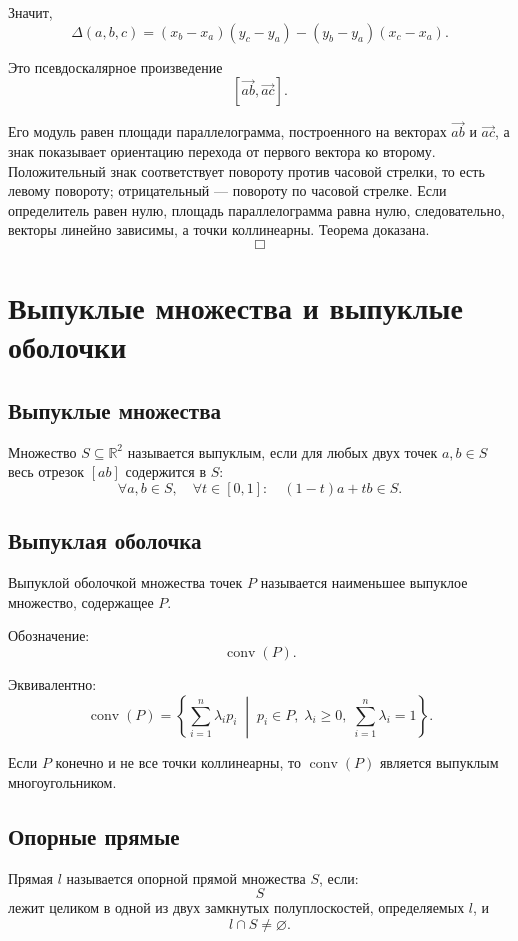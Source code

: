 \documentclass[12pt,a4paper]{article}
\begin{document}
Значит,
\[
\Delta(a,b,c)
=
(x_b-x_a)(y_c-y_a)
-
(y_b-y_a)(x_c-x_a).
\]

Это псевдоскалярное произведение
\[
[\overrightarrow{ab},\overrightarrow{ac}].
\]

Его модуль равен площади параллелограмма, построенного на векторах
\(\overrightarrow{ab}\) и \(\overrightarrow{ac}\), а знак показывает ориентацию перехода от первого вектора ко второму. Положительный знак соответствует повороту против часовой стрелки, то есть левому повороту; отрицательный — повороту по часовой стрелке. Если определитель равен нулю, площадь параллелограмма равна нулю, следовательно, векторы линейно зависимы, а точки коллинеарны. Теорема доказана.
\[
\Box
\]

\section{Выпуклые множества и выпуклые оболочки}

\subsection{Выпуклые множества}

Множество \(S\subseteq\mathbb{R}^2\) называется выпуклым, если для любых двух точек \(a,b\in S\) весь отрезок \([ab]\) содержится в \(S\):
\[
\forall a,b\in S,\quad
\forall t\in[0,1]:
\quad
(1-t)a+tb\in S.
\]

\subsection{Выпуклая оболочка}

Выпуклой оболочкой множества точек \(P\) называется наименьшее выпуклое множество, содержащее \(P\).

Обозначение:
\[
\operatorname{conv}(P).
\]

Эквивалентно:
\[
\operatorname{conv}(P)
=
\left\{
\sum_{i=1}^{n}\lambda_i p_i
\;\middle|\;
p_i\in P,\;
\lambda_i\ge 0,\;
\sum_{i=1}^{n}\lambda_i=1
\right\}.
\]

Если \(P\) конечно и не все точки коллинеарны, то \(\operatorname{conv}(P)\) является выпуклым многоугольником.

\subsection{Опорные прямые}

Прямая \(l\) называется опорной прямой множества \(S\), если:
\[
S
\]
лежит целиком в одной из двух замкнутых полуплоскостей, определяемых \(l\), и
\[
l\cap S\neq\varnothing.
\]
\end{document}
